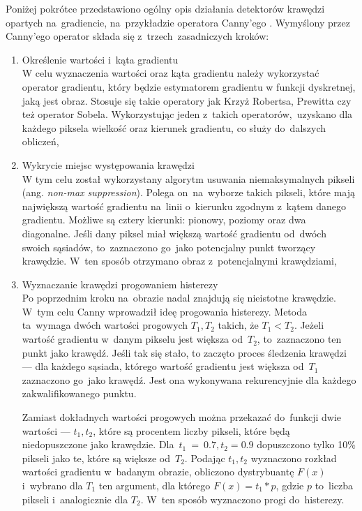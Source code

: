 \documentclass[a4paper,11pt,twoside,openright]{report}
\theoremstyle{definition}
\begin{document}
Poniżej pokrótce przedstawiono ogólny opis działania detektorów krawędzi opartych na~gradiencie,
na~przykładzie operatora Canny'ego \cite{Canny}. Wymyślony przez Canny'ego operator
składa się z~trzech~zasadniczych kroków:
\begin{enumerate}%
\item Określenie wartości i~kąta gradientu \\
W celu wyznaczenia wartości oraz kąta gradientu należy wykorzystać operator gradientu,
który będzie estymatorem gradientu w funkcji dyskretnej, jaką jest obraz.
Stosuje się takie operatory jak Krzyż Robertsa, Prewitta czy też operator Sobela.
Wykorzystując jeden z~takich operatorów,~uzyskano dla każdego piksela wielkość oraz
kierunek gradientu, co służy do~dalszych obliczeń,
\item Wykrycie miejsc występowania krawędzi \\
W tym celu został wykorzystany algorytm usuwania niemaksymalnych pikseli
(ang. \textit{non-max suppression}). Polega on~na~wyborze
takich pikseli, które mają największą wartość gradientu na~linii o~kierunku
zgodnym z~kątem danego gradientu. Możliwe są cztery kierunki: pionowy, poziomy oraz
dwa diagonalne. Jeśli dany piksel miał większą wartość gradientu od~dwóch swoich
sąsiadów, to~zaznaczono go~jako potencjalny punkt tworzący krawędzie. W~ten sposób
otrzymano obraz z~potencjalnymi krawędziami,
\item Wyznaczanie krawędzi progowaniem histerezy \\
Po poprzednim kroku na~obrazie nadal znajdują się nieistotne krawędzie. W~tym celu
Canny wprowadził ideę progowania histerezy. Metoda ta~wymaga dwóch wartości progowych
$T_1, T_2$ takich, że $T_1 < T_2$. Jeżeli wartość gradientu w~danym pikselu jest
większa od~$T_2$, to~zaznaczono ten punkt jako krawędź. Jeśli tak się stało, to
zaczęto proces śledzenia krawędzi --- dla każdego sąsiada, którego wartość gradientu
jest większa od~$T_1$ zaznaczono go~jako krawędź. Jest ona wykonywana rekurencyjnie
dla każdego zakwalifikowanego punktu.

Zamiast dokładnych wartości progowych można przekazać do~funkcji dwie wartości ---
$t_1, t_2$, które są procentem liczby pikseli, które będą niedopuszczone jako
krawędzie. Dla~$t_1~=~0.7, t_2 = 0.9$ dopuszczono tylko 10\% pikseli jako te,
które są większe od~$T_2$. Podając $t_1, t_2$ wyznaczono rozkład wartości
gradientu w~badanym obrazie, obliczono dystrybuantę $F(x)$ i~wybrano dla $T_1$
ten argument, dla którego $F(x) = t_1 * p$, gdzie $p$ to~liczba pikseli i~analogicznie
dla $T_2$. W~ten sposób wyznaczono progi do~histerezy.

\end{enumerate}
\end{document}
